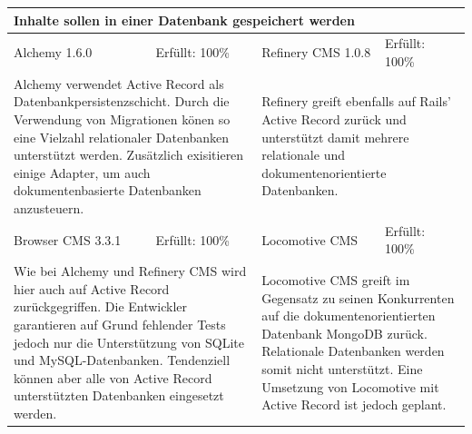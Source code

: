 \begin{tabular}[!ht]{|l|l|l|l|}
\hline
\multicolumn{4}{|p{15cm}|}{\textbf{Inhalte sollen in einer Datenbank gespeichert werden}} \\
\hline
  Alchemy 1.6.0 & \cellcolor{green}Erfüllt: 100\% & Refinery CMS 1.0.8 & \cellcolor{green}Erfüllt: 100\% \\
  \hline
  \multicolumn{2}{|p{7.5cm}|}{Alchemy verwendet Active Record als Datenbankpersistenzschicht. Durch die Verwendung von Migrationen könen so eine Vielzahl relationaler Datenbanken unterstützt werden. Zusätzlich exisitieren einige Adapter, um auch dokumentenbasierte Datenbanken anzusteuern.}
   & \multicolumn{2}{p{7.5cm}|}{Refinery greift ebenfalls auf Rails' Active Record zurück und unterstützt damit mehrere relationale und dokumentenorientierte Datenbanken.} \\
  \hline
  Browser CMS 3.3.1 & \cellcolor{green}Erfüllt: 100\% & Locomotive CMS & \cellcolor{green}Erfüllt: 100\% \\
  \hline
  \multicolumn{2}{|p{7.5cm}|}{Wie bei Alchemy und Refinery CMS wird hier auch auf Active Record zurückgegriffen. Die Entwickler garantieren auf Grund fehlender Tests jedoch nur die Unterstützung von SQLite und MySQL-Datenbanken. Tendenziell können aber alle von Active Record unterstützten Datenbanken eingesetzt werden.} & \multicolumn{2}{p{7.5cm}|}{Locomotive CMS greift im Gegensatz zu seinen Konkurrenten auf die dokumentenorientierten Datenbank MongoDB zurück. Relationale Datenbanken werden somit nicht unterstützt. Eine Umsetzung von Locomotive mit Active Record ist jedoch geplant.} \\
\hline
\end{tabular}
\newline
\newline
\newline
